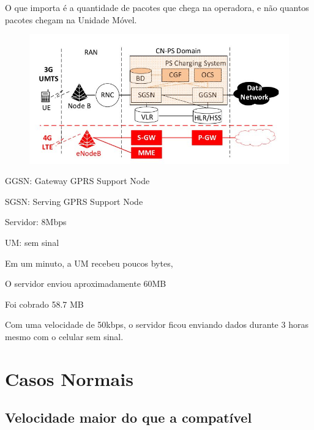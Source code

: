 \documentclass[brazil]{beamer}
\begin{document}
\begin{frame}[fragile]
    O que importa é a quantidade de pacotes que chega na operadora, e não quantos pacotes chegam na Unidade Móvel.
    \begin{figure}
    \begin{center}
        \includegraphics[scale=0.3]{images/arquitetura3G.jpg}
    \end{center}
    \end{figure}
    GGSN: Gateway GPRS Support Node
    
    SGSN: Serving GPRS Support Node
\end{frame}

\begin{frame}[fragile]
    Servidor: 8Mbps

    UM: sem sinal
    
    \vspace{0.4cm}

    Em um minuto, a UM recebeu poucos bytes,

    O servidor enviou aproximadamente 60MB
  
    Foi cobrado 58.7 MB
\end{frame}

\begin{frame}[fragile]
    Com uma velocidade de 50kbps, o servidor ficou enviando dados durante 3 horas mesmo com o celular sem sinal.
\end{frame}

\section{Casos Normais}


\subsection{Velocidade maior do que a compatível}
\end{document}

